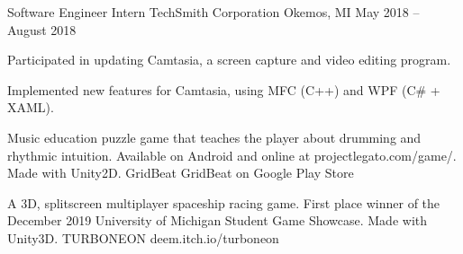 \documentclass[]{awesome-cv}
\begin{document}
	\vspace{-4mm}
	\cventry
	{Software Engineer Intern}
	{TechSmith Corporation}
	{Okemos, MI}
	{May 2018 – August 2018}
	{\begin{cvitems}
		\item {Participated in updating Camtasia, a screen capture and video editing program.}
		\item {Implemented new features for Camtasia, using MFC (C++) and WPF (C\# + XAML).}
	\end{cvitems}}



\vspace{-6mm}
\vspace{-2mm}

	\cventry
	{Music education puzzle game that teaches the player about drumming and rhythmic intuition. Available on Android and online at projectlegato.com/game/.
	 Made with Unity2D.}
	{GridBeat}
	{GridBeat on Google Play Store}
	{}
	{}

	\vspace{-6mm}
	\cventry
	{A 3D, splitscreen multiplayer spaceship racing game. First place winner of the December 2019 University of Michigan Student Game Showcase.
	 Made with Unity3D.}
	{TURBONEON}
	{deem.itch.io/turboneon}
	{}
	{}
\end{document}

